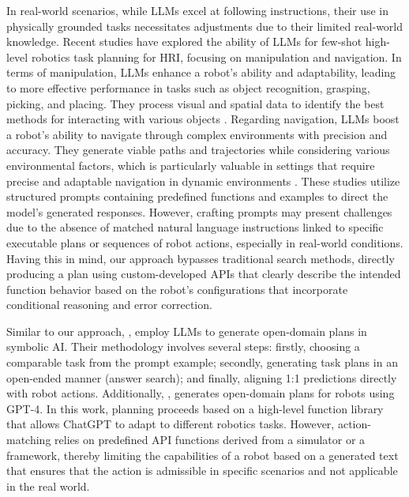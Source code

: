 In real-world scenarios, while LLMs excel at following instructions, their use in physically grounded tasks necessitates adjustments due to their limited real-world knowledge. 
Recent studies have explored the ability of LLMs for few-shot high-level robotics task planning \cite{liang2023code, huang2022language, xu2018neural, srinivas2018universal, akakziagrounding, song2023llm} for HRI, focusing on manipulation and navigation. In terms of manipulation, LLMs enhance a robot's ability and adaptability, leading to more effective performance in tasks such as object recognition, grasping, picking, and placing. They process visual and spatial data to identify the best methods for interacting with various objects \cite{jin2023alphablock, ha2023scaling}. Regarding navigation, LLMs boost a robot’s ability to navigate through complex environments with precision and accuracy. They generate viable paths and trajectories while considering various environmental factors, which is particularly valuable in settings that require precise and adaptable navigation in dynamic environments \cite{rajvanshi2024saynav, dorbala2023can, huang2023visual}. These studies utilize structured prompts containing predefined functions and examples to direct the model's generated responses. However, crafting prompts may present challenges due to the absence of matched natural language instructions linked to specific executable plans or sequences of robot actions, especially in real-world conditions. Having this in mind, our approach bypasses traditional search methods, directly producing a plan using custom-developed APIs that clearly describe the intended function behavior based on the robot's configurations that incorporate conditional reasoning and error correction.


\color{black}
Similar to our approach, \cite{huang2022language}, employ LLMs to generate open-domain plans in symbolic AI. Their methodology involves several steps: firstly, choosing a comparable task from the prompt example; secondly, generating task plans in an open-ended manner (answer search); and finally, aligning 1:1 predictions directly with robot actions. Additionally, \cite{vemprala2023chatgpt}, generates open-domain plans for robots using GPT-4. In this work, planning proceeds based on a high-level function library that allows ChatGPT to adapt to different robotics tasks. However, action-matching relies on predefined API functions derived from a simulator or a framework, thereby limiting the capabilities of a robot based on a generated text that ensures that the action is admissible in specific scenarios and not applicable in the real world.

